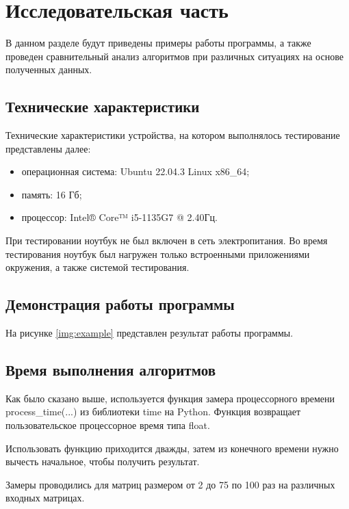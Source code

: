 \chapter{Исследовательская часть}

В данном разделе будут приведены примеры работы программы, а также проведен сравнительный анализ алгоритмов при различных ситуациях на основе полученных данных.

\section{Технические характеристики}

Технические характеристики устройства, на котором выполнялось тестирование представлены далее:

\begin{itemize}
    \item операционная система: Ubuntu 22.04.3 \cite{ubuntu} Linux \cite{linux} x86\_64;
    \item память: 16 Гб;
    \item процессор: Intel® Core™ i5-1135G7 @ 2.40Гц.
\end{itemize}

При тестировании ноутбук не был включен в сеть электропитания. Во время тестирования ноутбук был нагружен только встроенными приложениями окружения, а также системой тестирования.

\section{Демонстрация работы программы}

На рисунке \ref{img:example} представлен результат работы программы.

\clearpage

\section{Время выполнения алгоритмов}

Как было сказано выше, используется функция замера процессорного времени process\_time(...) из библиотеки time на Python. Функция возвращает пользовательское процессорное время типа float.

Использовать функцию приходится дважды, затем из конечного времени нужно вычесть начальное, чтобы получить результат.

Замеры проводились для матриц размером от 2 до 75 по 100 раз на различных входных матрицах.

